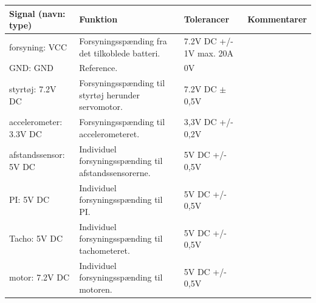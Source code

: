 \begin{table}[h]
	\centering
	\begin{tabularx}{\textwidth}{|l|X|X|X|} \hline
	\textbf{Signal (navn: type)} & \textbf{Funktion} & \textbf{Tolerancer} & \textbf{Kommentarer} \\ \hline
forsyning: VCC
	& Forsyningsspænding fra det tilkoblede batteri. 
	& 7.2V DC +/- 1V max. 20A
 	& ~
	\\ \hline
	
GND: GND
	& Reference. 
	& 0V
 	& ~
	\\ \hline
	
styrtøj: 7.2V DC
	& Forsyningsspænding til styrtøj herunder servomotor. 
	& 7.2V DC $\pm$ 0,5V %
 	& ~
	\\ \hline
	
accelerometer: 3.3V DC
	& Forsyningsspænding til accelerometeret.
	& 3,3V DC +/- 0,2V %
 	& ~
	\\ \hline
	
afstandssensor: 5V DC
	& Individuel forsyningsspænding til afstandssensorerne.
	& 5V DC +/- 0,5V %
 	& ~
	\\ \hline
	
PI: 5V DC
	& Individuel forsyningsspænding til PI.
	& 5V DC +/- 0,5V %
 	& ~
	\\ \hline
	
Tacho: 5V DC
	& Individuel forsyningsspænding til tachometeret.
	& 5V DC +/- 0,5V %
 	& ~
	\\ \hline
	
motor: 7.2V DC
	& Individuel forsyningsspænding til motoren.
	& 5V DC +/- 0,5V %
 	& ~
	\\ \hline
	\end{tabularx}
\end{table}


\clearpage

\clearpage



\clearpage


